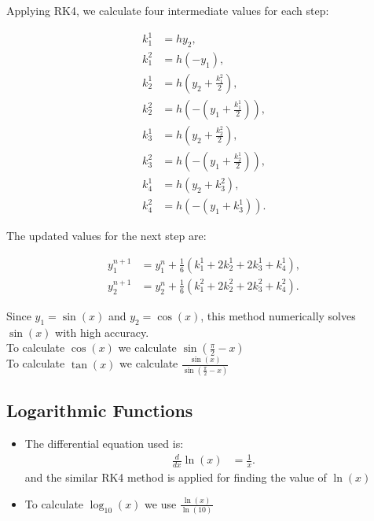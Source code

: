 \documentclass{article}
\begin{document}
Applying RK4, we calculate four intermediate values for each step:

\begin{align}
    k_1^1 &= h y_2, \\
    k_1^2 &= h (-y_1), \\
    k_2^1 &= h \left(y_2 + \frac{k_1^2}{2} \right), \\
    k_2^2 &= h \left(-\left(y_1 + \frac{k_1^1}{2} \right) \right), \\
    k_3^1 &= h \left(y_2 + \frac{k_2^2}{2} \right), \\
    k_3^2 &= h \left(-\left(y_1 + \frac{k_2^1}{2} \right) \right), \\
    k_4^1 &= h \left(y_2 + k_3^2 \right), \\
    k_4^2 &= h \left(-\left(y_1 + k_3^1 \right) \right).
\end{align}

The updated values for the next step are:

\begin{align}
    y_1^{n+1} &= y_1^n + \frac{1}{6} (k_1^1 + 2k_2^1 + 2k_3^1 + k_4^1), \\
    y_2^{n+1} &= y_2^n + \frac{1}{6} (k_1^2 + 2k_2^2 + 2k_3^2 + k_4^2).
\end{align}

Since $y_1 = \sin(x)$ and $y_2 = \cos(x)$, this method numerically solves $\sin(x)$ with high accuracy.\\

To calculate $\cos(x)$ we calculate $\sin(\frac{\pi}{2} - x)$\\
To calculate $\tan(x)$ we calculate $\frac{\sin(x)}{\sin(\frac{\pi}{2} - x)}$\\


\subsection{Logarithmic Functions}

\begin{itemize}
	\item The differential equation used is:
\begin{align}
    \frac{d}{dx} \ln(x) &= \frac{1}{x}.
\end{align}
 and the similar RK4 method is applied for finding the value of $\ln(x)$
\item To calculate $\log_{10}(x)$ we use $\frac{\ln(x)}{\ln(10)}$
\end{itemize}
\end{document}
